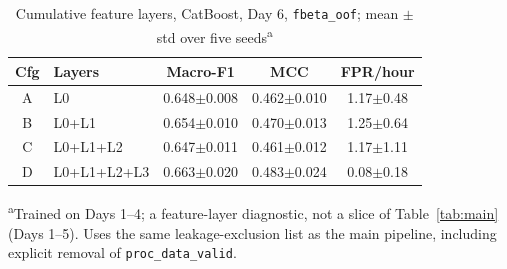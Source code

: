\documentclass[conference]{IEEEtran}
\begin{document}
\begin{table}[t]
\caption{Cumulative feature layers, CatBoost, Day 6, \texttt{fbeta\_oof}; mean $\pm$ std over five
seeds\textsuperscript{a}}
\label{tab:ablation}
\centering
\small
\begin{tabular}{clccc}
\toprule
Cfg & Layers & Macro-F1 & MCC & FPR/hour \\
\midrule
A & L0             & 0.648$\pm$0.008 & 0.462$\pm$0.010 & 1.17$\pm$0.48 \\
B & L0+L1          & 0.654$\pm$0.010 & 0.470$\pm$0.013 & 1.25$\pm$0.64 \\
C & L0+L1+L2       & 0.647$\pm$0.011 & 0.461$\pm$0.012 & 1.17$\pm$1.11 \\
D & L0+L1+L2+L3    & 0.663$\pm$0.020 & 0.483$\pm$0.024 & 0.08$\pm$0.18 \\
\bottomrule
\end{tabular}

\vspace{2pt}
\raggedright\footnotesize\textsuperscript{a}Trained on Days 1--4; a feature-layer diagnostic, not a
slice of Table~\ref{tab:main} (Days 1--5). Uses the same leakage-exclusion list as the main pipeline,
including explicit removal of \texttt{proc\_data\_valid}.
\end{table}
\end{document}
